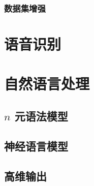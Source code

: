 \subsubsection{数据集增强}
\label{subsubsec:dataset_augmentation}

\section{语音识别}
\label{sec:speech_recognition}

\section{自然语言处理}
\label{sec:natural_language_processing}

\subsection{$n$ 元语法模型}
\label{subsec:ngrams}

\subsection{神经语言模型}
\label{subsec:neural_language_models}

\subsection{高维输出}
\label{high_dimentional_outputs}

